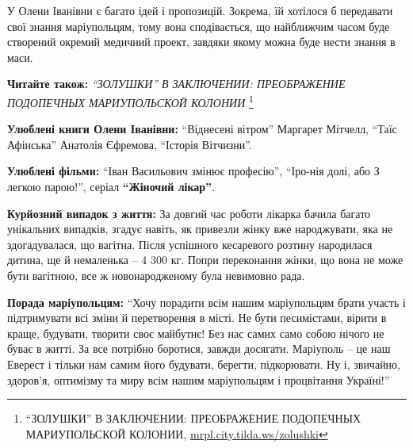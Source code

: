 
У Олени Іванівни є багато ідей і пропозицій. Зокрема, їй хотілося б передавати
свої знання маріупольцям, тому вона сподівається, що найближчим часом буде
створений окремий медичний проект, завдяки якому можна буде нести знання в
маси.

\textbf{Читайте також:} \emph{\enquote{ЗОЛУШКИ} В ЗАКЛЮЧЕНИИ: ПРЕОБРАЖЕНИЕ ПОДОПЕЧНЫХ МАРИУПОЛЬСКОЙ КОЛОНИИ}%
\footnote{\enquote{ЗОЛУШКИ} В ЗАКЛЮЧЕНИИ: ПРЕОБРАЖЕНИЕ ПОДОПЕЧНЫХ МАРИУПОЛЬСКОЙ КОЛОНИИ, \url{mrpl.city.tilda.ws/zolushki}}

\textbf{Улюблені книги Олени Іванівни:} \enquote{Віднесені вітром} Маргарет Мітчелл, \enquote{Таїс Афінська} Анатолія Єфремова, \enquote{Історія Вітчизни}.

\textbf{Улюблені фільми:} \enquote{Іван Васильович змінює професію}, \enquote{Іро\hyp{}нія долі, або З легкою парою!}, серіал \textbf{\enquote{Жіночий лікар}}.


\textbf{Курйозний випадок з життя:} За довгий час роботи лікарка бачила багато
унікальних випадків, згадує навіть, як привезли жінку вже народжувати, яка не
здогадувалася, що вагітна. Після успішного кесаревого розтину народилася
дитина, ще й немаленька – 4 300 кг. Попри переконання жінки, що вона не може
бути вагітною, все ж новонародженому була невимовно рада.

\textbf{Порада маріупольцям:} \enquote{Хочу порадити всім нашим маріупольцям брати
участь і підтримувати всі зміни й перетворення в місті. Не бути песимістами,
вірити в краще, будувати, творити своє майбутнє! Без нас самих само собою
нічого не буває в житті. За все потрібно боротися, завжди досягати. Маріуполь –
це наш Еверест і тільки нам самим його будувати, берегти, підкорювати. Ну і,
звичайно, здоров'я, оптимізму та миру всім нашим маріупольцям і процвітання
Україні!}
